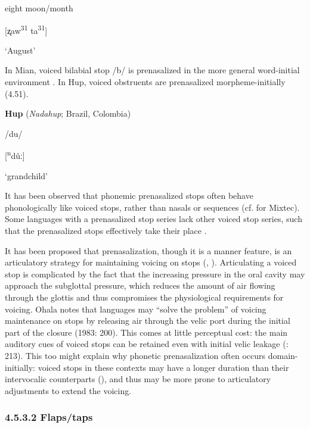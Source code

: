   eight   moon/month

  [ʐaw\textsuperscript{31} ta\textsuperscript{31}]

  ‘August’

\citep[40]{Shen2003}

\z

  In Mian, voiced bilabial stop /b/ is prenasalized in the more general word-initial environment \citep{Fedden2007}. In Hup, voiced obstruents are prenasalized morpheme-initially (4.51).

\ea\label{ex:(4.51)}
  \textbf{Hup} (\textit{Nadahup}; Brazil, Colombia)

/du/

[\textsuperscript{n}dûː]

‘grandchild’

\citep[54]{Epps2008}

\z

  It has been observed that phonemic prenasalized stops often behave phonologically like voiced stops, rather than nasals or sequences (cf. \citealt{IversonSalmons1996} for Mixtec). Some languages with a prenasalized stop series lack other voiced stop series, such that the prenasalized stops effectively take their place \citep[67-8]{Maddieson1984}.

  It has been proposed that prenasalization, though it is a manner feature, is an articulatory strategy for maintaining voicing on stops (\citealt{Ohala1983}, \citealt{HentonEtAl1992}). Articulating a voiced stop is complicated by the fact that the increasing pressure in the oral cavity may approach the subglottal pressure, which reduces the amount of air flowing through the glottis and thus compromises the physiological requirements for voicing. Ohala notes that languages may “solve the problem” of voicing maintenance on stops by releasing air through the velic port during the initial part of the closure (1983: 200). This comes at little perceptual cost: the main auditory cues of voiced stops can be retained even with initial velic leakage (\citealt{OhalaOhala1991}: 213). This too might explain why phonetic prenasalization often occurs domain-initially: voiced stops in these contexts may have a longer duration than their intervocalic counterparts (\citealt{FlegeBrown1982}), and thus may be more prone to articulatory adjustments to extend the voicing.

\subsubsection{\textbf{4.5.3.2} \textbf{Flaps/taps} }

